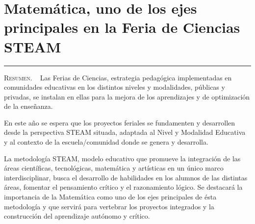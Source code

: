 \thispagestyle{portadapage}
\setcounter{subsection}{0}
\setcounter{subsubsection}{0}
\setcounter{actividad}{0}
\setcounter{actividad_previa}{0}
\setcounter{actividad_entre}{0}
\renewcommand{\articulotipo}{Comunicación breve}
\renewcommand{\articulotitulo}{Matemática, uno de los ejes principales en la Feria de Ciencias STEAM}
\renewcommand{\articulotitulocorto}{Matemática, uno de los ejes principales en la Feria de Ciencias STEAM}
\section{\articulotitulo}

\noindent\rule{\linewidth}{2pt}

\vspace{0.25cm}

\begin{flushright}
	\vspace{1em}
\end{flushright}

\vspace{0.5cm}

\begin{center}
	\begin{minipage}{0.75\linewidth} \small
		\textsc{Resumen}. ~
		Las Ferias de Ciencias, estrategia pedagógica implementadas en comunidades educativas en los distintos niveles y modalidades, públicas y privadas, se instalan en ellas para la mejora de los aprendizajes y de optimización de la enseñanza.
		
		En este año se espera que los proyectos feriales se fundamenten y desarrollen desde la perspectiva STEAM situada, adaptada al Nivel y Modalidad Educativa y al contexto de la escuela/comunidad donde se genera y desarrolla.
		
		La metodología STEAM, modelo educativo que promueve la integración de las áreas científicas, tecnológicas, matemática y artísticas en un único marco interdisciplinar, busca el desarrollo de habilidades en los alumnos de las distintas áreas, fomentar el pensamiento crítico y el razonamiento lógico. Se destacará la importancia de la Matemática como uno de los ejes principales de ésta metodología y que servirá para vertebrar los proyectos integrados y la construcción del aprendizaje autónomo y crítico.
	\end{minipage}
\end{center}

